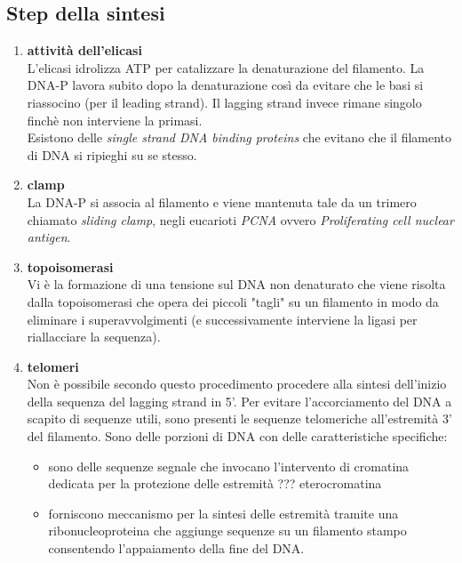         \subsection{Step della sintesi}
            \begin{enumerate}
                \item \textbf{attività dell'elicasi}\\
                L'elicasi idrolizza ATP per catalizzare la denaturazione del filamento. La DNA-P lavora subito dopo la denaturazione così da evitare che le basi si riassocino (per il leading strand). Il lagging strand invece rimane singolo finchè non interviene la primasi.\\
                Esistono delle \textit{single strand DNA binding proteins} che evitano che il filamento di DNA si ripieghi su se stesso.
                \item \textbf{clamp}\\
                La DNA-P si associa al filamento e viene mantenuta tale da un trimero chiamato \textit{ sliding clamp}, negli eucarioti \textit{PCNA} ovvero \textit{Proliferating cell nuclear antigen}.
                \item \textbf{topoisomerasi}\\
                Vi è la formazione di una tensione sul DNA non denaturato che viene risolta dalla topoisomerasi che opera dei piccoli "tagli" su un filamento in modo da eliminare i superavvolgimenti (e successivamente interviene la ligasi per riallacciare la sequenza).
                \item \textbf{telomeri}\\
                Non è possibile secondo questo procedimento procedere alla sintesi dell'inizio della sequenza del lagging strand in 5'. Per evitare l'accorciamento del DNA a scapito di sequenze utili, sono presenti le sequenze telomeriche all'estremità 3' del filamento. Sono delle porzioni di DNA con delle caratteristiche specifiche:
                \begin{itemize}
                    \item sono delle sequenze segnale che invocano l'intervento di cromatina dedicata per la protezione delle estremità ??? eterocromatina
                    \item forniscono meccanismo per la sintesi delle estremità tramite una ribonucleoproteina che aggiunge sequenze su un filamento stampo consentendo l'appaiamento della fine del DNA.
                \end{itemize}
            \end{enumerate}
